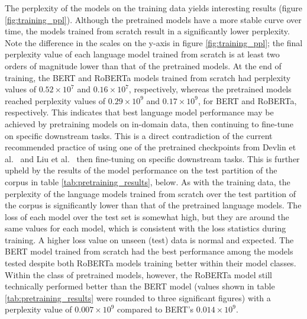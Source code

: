\documentclass[12pt]{article}
\begin{document}
The perplexity of the models on the training data yields interesting results (figure \ref{fig:training_ppl}). Although the pretrained models have a
more stable curve over time, the models trained from scratch result in a significantly lower perplexity. Note the difference in the scales on the
y-axis in figure \ref{fig:training_ppl}; the final perplexity value of each language model trained from scratch is at least two orders of magnitude
lower than that of the pretrained models. At the end of training, the BERT and RoBERTa models trained from scratch had perplexity values of
$0.52\times 10^7$ and $0.16\times 10^7$, respectively, whereas the pretrained models reached perplexity values of $0.29\times 10^9$ and
$0.17\times 10^9$, for BERT and RoBERTa, respectively. This indicates that best language model performance may be achieved by pretraining models on
in-domain data, then continuing to fine-tune on specific downstream tasks. This is a direct contradiction of the current recommended practice of using
one of the pretrained checkpoints from Devlin et al.~\cite{devlin_bert_2019} and Liu et al.~\cite{liu_roberta_2019} then fine-tuning on specific
downstream tasks. This is further upheld by the results of the model performance on the test partition of the corpus in table
\ref{tab:pretraining_results}, below. As with the training data, the perplexity of the language models trained from scratch over the test partition of
the corpus is significantly lower than that of the pretrained language models. The loss of each model over the test set is somewhat high, but they are
around the same values for each model, which is consistent with the loss statistics during training. A higher loss value on unseen (test) data is
normal and expected. The BERT model trained from scratch had the best performance among the models tested despite both RoBERTa models training better
within their model classes. Within the class of pretrained models, however, the RoBERTa model still technically performed better than the BERT model
(values shown in table \ref{tab:pretraining_results} were rounded to three significant figures) with a perplexity value of $0.007\times 10^9$ compared
to BERT's $0.014\times 10^9$.
\end{document}
